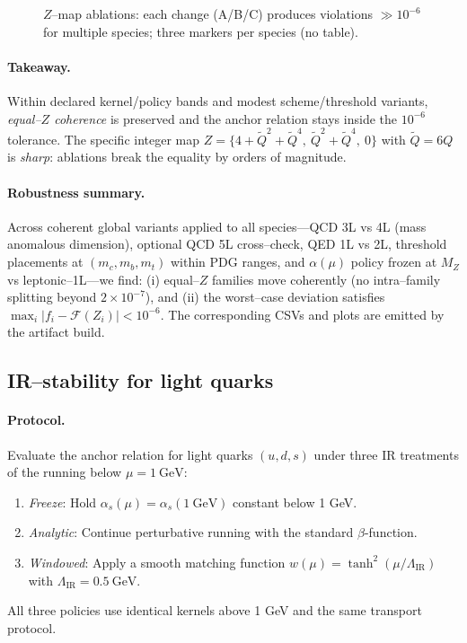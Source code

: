 \documentclass[epjc3]{svjour3}
\begin{document}
\begin{figure}[t]
  \centering
  \caption{$Z$–map ablations: each change (A/B/C) produces violations $\gg 10^{-6}$ for multiple species; three markers per species (no table).}
\end{figure}

\paragraph{Takeaway.} Within declared kernel/policy bands and modest scheme/threshold variants, \emph{equal–$Z$ coherence} is preserved and the anchor relation stays inside the $10^{-6}$ tolerance. The specific integer map $Z=\{4+\tilde Q^2+\tilde Q^4,\ \tilde Q^2+\tilde Q^4,\ 0\}$ with $\tilde Q=6Q$ is \emph{sharp}: ablations break the equality by orders of magnitude.

\paragraph{Robustness summary.} Across coherent global variants applied to all species—QCD 3L vs 4L (mass anomalous dimension), optional QCD 5L cross–check, QED 1L vs 2L, threshold placements at $(m_c,m_b,m_t)$ within PDG ranges, and $\alpha(\mu)$ policy frozen at $M_Z$ vs leptonic–1L—we find: (i) equal–$Z$ families move coherently (no intra–family splitting beyond $2\times10^{-7}$), and (ii) the worst–case deviation satisfies $\max_i|f_i-\mathcal F(Z_i)|<10^{-6}$. The corresponding CSVs and plots are emitted by the artifact build.

\subsection{IR–stability for light quarks}\label{sec:robust-IR}

\paragraph{Protocol.} Evaluate the anchor relation for light quarks $(u,d,s)$ under three IR treatments of the running below $\mu = 1~\mathrm{GeV}$:
\begin{enumerate}
  \item \emph{Freeze}: Hold $\alpha_s(\mu) = \alpha_s(1~\mathrm{GeV})$ constant below 1 GeV.
  \item \emph{Analytic}: Continue perturbative running with the standard $\beta$-function.
  \item \emph{Windowed}: Apply a smooth matching function $w(\mu) = \tanh^2(\mu/\Lambda_{\mathrm{IR}})$ with $\Lambda_{\mathrm{IR}} = 0.5~\mathrm{GeV}$.
\end{enumerate}
All three policies use identical kernels above 1 GeV and the same transport protocol.
\end{document}
